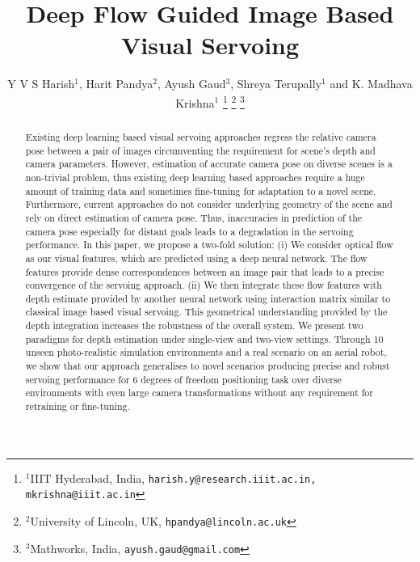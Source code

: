 \documentclass[letterpaper, 10 pt, conference]{ieeeconf}  %
\title{\LARGE \bf
Deep Flow Guided Image Based Visual Servoing 
}
\author{Y V S Harish$^{1}$,  Harit Pandya$^{2}$, Ayush Gaud$^{3}$, Shreya Terupally$^{1}$ and K. Madhava Krishna$^{1}$ %
\thanks{$^{1}$IIIT Hyderabad, India,
        {\tt\small harish.y@research.iiit.ac.in, \hspace{5mm} mkrishna@iiit.ac.in}}%
\thanks{$^{2}$University of Lincoln, UK,
        {\tt\small hpandya@lincoln.ac.uk}}%
\thanks{$^{3}$Mathworks, India,
        {\tt\small ayush.gaud@gmail.com}}%
}
\begin{document}
\newpage
\maketitle
\thispagestyle{empty}
\pagestyle{empty}


\begin{abstract}

Existing deep learning based visual servoing approaches regress the relative camera pose between a pair of images circumventing the requirement for scene's depth and camera parameters. However, estimation of accurate camera pose on diverse scenes is a non-trivial problem, thus existing deep learning based approaches require a huge amount of training data and sometimes fine-tuning for adaptation to a novel scene.
Furthermore, current approaches do not consider underlying geometry of the scene and rely on direct estimation of camera pose. Thus, inaccuracies in prediction of the camera pose especially for distant goals leads to a degradation in the servoing performance. In this paper, we propose a two-fold solution: (i) We consider optical flow as our visual features, which are predicted using a deep neural network. The flow features provide dense correspondences between an image pair that leads to a precise convergence of the servoing approach. (ii)  We then integrate these flow features with depth estimate provided by another neural network using interaction matrix similar to classical image based visual servoing. This geometrical understanding provided by the depth integration increases the robustness of the overall system. We present two paradigms for depth estimation under single-view and two-view settings. Through 10 unseen photo-realistic simulation environments and a real scenario on an aerial robot, we show that our approach generalises to novel scenarios producing precise and robust servoing performance for 6 degrees of freedom positioning task over diverse environments with even large camera transformations without any requirement for retraining or fine-tuning. 

%
\end{abstract}

\end{document}
